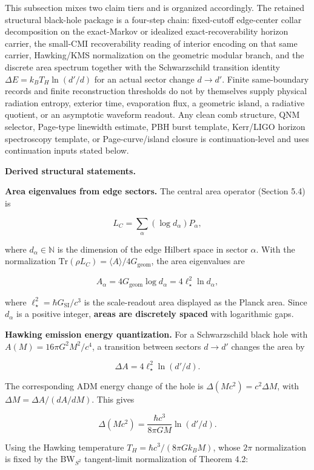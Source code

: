 This subsection mixes two claim tiers and is organized accordingly. The retained structural
black-hole package is a four-step chain: fixed-cutoff edge-center collar decomposition on the
exact-Markov or idealized exact-recoverability horizon carrier, the small-CMI recoverability
reading of interior encoding on that same carrier, Hawking/KMS normalization on the geometric
modular branch, and the discrete area spectrum together with the Schwarzschild transition identity
\(\Delta E = k_B T_H \ln(d'/d)\) for an actual sector change \(d \to d'\). Finite same-boundary
records and finite reconstruction thresholds do not by themselves supply physical radiation
entropy, exterior time, evaporation flux, a geometric island, a radiative quotient, or an
asymptotic waveform readout. Any clean comb structure, QNM selector, Page-type linewidth estimate,
PBH burst template, Kerr/LIGO horizon spectroscopy template, or Page-curve/island closure is
continuation-level and uses continuation inputs stated below.

\textbf{Derived structural statements.}

\textbf{Area eigenvalues from edge sectors.} The central area operator (Section 5.4) is

\[
L_C = \sum_\alpha (\log d_\alpha) P_\alpha,
\]

where \(d_\alpha \in \mathbb{N}\) is the dimension of the edge Hilbert space in sector \(\alpha\). With the normalization \(\mathrm{Tr}(\rho L_C) = \langle A
\rangle / 4G_{\mathrm{geom}}\), the area eigenvalues are

\[
A_\alpha = 4G_{\mathrm{geom}} \log d_\alpha = 4\ell_\star^2 \ln d_\alpha,
\]

where \(\ell_\star^2=\hbar G_{\mathrm{SI}}/c^3\) is the scale-readout area displayed as the
Planck area. Since \(d_\alpha\) is a positive integer, \textbf{areas are discretely spaced} with
logarithmic gaps.

\textbf{Hawking emission energy quantization.} For a Schwarzschild black hole with \(A(M) = 16\pi G^2 M^2/c^4\), a transition between sectors \(d \to d'\) changes the area by

\[
\Delta A = 4\ell_\star^2 \ln(d'/d).
\]

The corresponding ADM energy change of the hole is \(\Delta(Mc^2) = c^2 \Delta M\), with \(\Delta M = \Delta A / (dA/dM)\). This gives

\[
\Delta(Mc^2) = \frac{\hbar c^3}{8\pi G M} \ln(d'/d).
\]

Using the Hawking temperature \(T_H = \hbar c^3 / (8\pi G k_B M)\), whose \(2\pi\) normalization is fixed by the BW\(_{S^2}\) tangent-limit normalization of Theorem 4.2:

